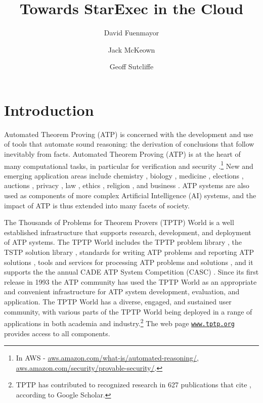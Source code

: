 \documentclass{easychair}
\title{Towards StarExec in the Cloud}
\author{
  David Fuenmayor\inst{1}
\and
  Jack McKeown\inst{2}
\and
  Geoff Sutcliffe\inst{2}
}
\institute{
  University of Bamberg,
  Bamberg, Germany\\
  \email{david.fuenmayor@uni-bamberg.de}
\and
  University of Miami,
  Miami, USA\\
  \email{jam771@miami.edu,geoff@cs.miami.edu}
}
\begin{document}
\maketitle

\begin{abstract}
\end{abstract}
\section{Introduction}
\label{Introduction}

Automated Theorem Proving (ATP) is concerned with the development and use of tools that automate 
sound reasoning: the derivation of conclusions that follow inevitably from facts.
Automated Theorem Proving (ATP) is at the heart of many computational tasks, in particular for
verification \cite{Har06,HH19} and security \cite{Coo18}.\footnote{%
In AWS -
\href{https://aws.amazon.com/what-is/automated-reasoning/}{aws.amazon.com/what-is/automated-reasoning/}, 
\href{https://aws.amazon.com/security/provable-security//}{aws.amazon.com/security/provable-security/}.} 
New and emerging application areas include
chemistry \cite{Yad17}, 
biology \cite{CC+13}, 
medicine \cite{HLB05},
elections \cite{Nip09,BDS17}, 
auctions \cite{CK+15}, 
privacy \cite{Lib20},
law \cite{PS15}, 
ethics \cite{DF+16}, 
religion \cite{OZ11,BW14-ECAI,Hor19},
and business \cite{Han98}.
ATP systems are also used as components of more complex Artificial Intelligence (AI) systems,
and the impact of ATP is thus extended into many facets of society.

The Thousands of Problems for Theorem Provers (TPTP) World \cite{Sut24} is a well established 
infrastructure that supports research, development, and deployment of ATP systems.
The TPTP World includes 
the TPTP problem library \cite{Sut17},
the TSTP solution library \cite{Sut10},
standards for writing ATP problems and reporting ATP solutions \cite{SS+06,Sut08-KEAPPA},
tools and services for processing ATP problems and solutions \cite{Sut10},
and it supports the the annual CADE ATP System Competition (CASC) \cite{Sut16}.
Since its first release in 1993 the ATP community has used the TPTP World as an appropriate and 
convenient infrastructure for ATP system development, evaluation, and application.
The TPTP World has a diverse, engaged, and sustained user community, with various parts of the 
TPTP World being deployed in a range of applications in both academia and industry.\footnote{%
TPTP has contributed to recognized research in 627 publications that cite \cite{Sut17},
according to Google Scholar.}
The web page \href{https://www.tptp.org}{\tt www.tptp.org} provides access to all components.
\end{document}
